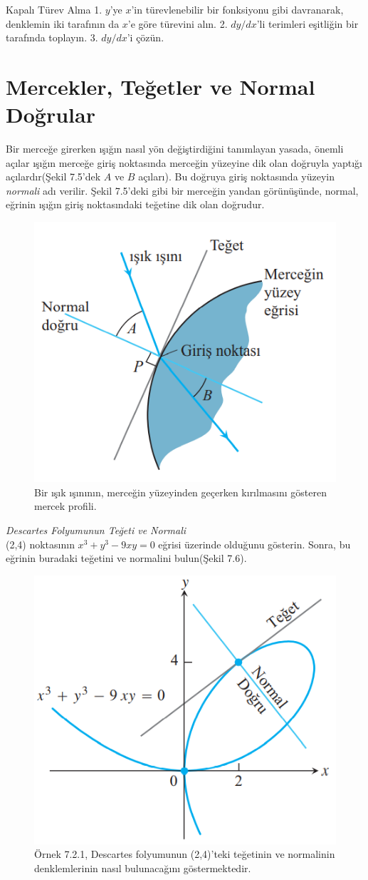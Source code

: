 Kapalı Türev Alma
1. $y$'ye $x$'in türevlenebilir bir fonksiyonu gibi davranarak, denklemin iki tarafının da $x$'e göre türevini alın.
2. $dy/dx$'li terimleri eşitliğin bir tarafında toplayın.
3. $dy/dx$'i çözün.\\

\section{\protect Mercekler, Teğetler ve Normal Doğrular}
Bir merceğe girerken ışığın nasıl yön değiştirdiğini tanımlayan yasada, önemli açılar ışığın merceğe giriş noktasında merceğin yüzeyine dik olan doğruyla yaptığı açılardır(Şekil 7.5'dek $A$ ve $B$ açıları). Bu doğruya giriş noktasında yüzeyin \textit{normali} adı verilir. Şekil 7.5'deki gibi bir merceğin yandan görünüşünde, normal, eğrinin ışığın giriş noktasındaki teğetine dik olan doğrudur.
\begin{figure}[H]
	\centering
	\includegraphics[width=0.5\linewidth]{kapaliturev5.png}
	\caption{Bir ışık ışınının, merceğin yüzeyinden geçerken kırılmasını gösteren mercek profili.}
	\label{fig:ornekresim}
\end{figure}
\begin{ornek}\textit{Descartes Folyumunun Teğeti ve Normali}\\
(2,4) noktasının $x^3+y^3-9xy=0$ eğrisi üzerinde olduğunu gösterin. Sonra, bu eğrinin buradaki teğetini ve normalini bulun(Şekil 7.6).
\begin{figure}[H]
	\centering
	\includegraphics[width=0.5\linewidth]{kapaliturev6.png}
	\caption{Örnek 7.2.1, Descartes folyumunun (2,4)'teki teğetinin ve normalinin denklemlerinin nasıl bulunacağını göstermektedir.}
	\label{fig:ornekresim}
\end{figure}
\end{ornek}

